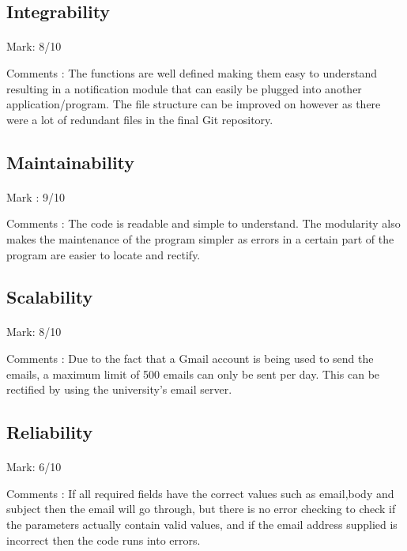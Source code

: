 \documentclass[11pt]{article}
\begin{document}
	\subsection{Integrability}
		\paragraph{} Mark: 8/10
		\noindent
		\begin{center}
			Comments : The functions are well defined making them easy to understand resulting in a notification module that can easily be plugged into another application/program. The file structure can be improved on however as there were a lot of redundant files in the final Git repository.
		\end{center}

	\subsection{Maintainability}
		\paragraph{} Mark : 9/10
		\noindent
		\begin{center}
			Comments : The code is readable and simple to understand. The modularity also makes the maintenance of the program simpler as errors in a certain part of the program are easier to locate and rectify. 
		\end{center}

	\subsection{Scalability}
		\paragraph{} Mark: 8/10
		\noindent
		\begin{center}
			Comments : Due to the fact that a Gmail account is being used to send the emails, a maximum limit of 500 emails can only be sent per day. This can be rectified by using the university's email server.
		\end{center}

	\subsection{Reliability}
		\paragraph{} Mark: 6/10
		\noindent
		\begin{center}
			Comments : If all required fields have the correct values such as email,body and subject then the email will go through, but there is no error checking to check if the parameters actually contain valid values, and if the email address supplied is incorrect then the code runs into errors.
		\end{center}
\end{document}
